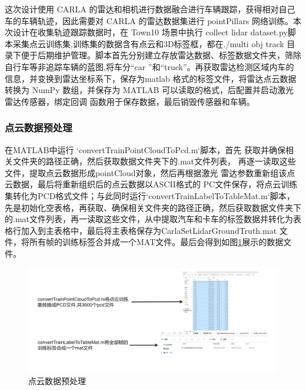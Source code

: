 这次设计使用 CARLA 的雷达和相机进行数据融合进行车辆跟踪，获得相对自己车的车辆轨迹，因此需要对 CARLA 的雷达数据集进行 pointPillars 网络训练。本次设计在收集轨迹跟踪数据时，在 Town10 场景中执行 collect lidar dataset.py脚本采集点云训练集,训练集的数据含有点云和3D标签框，都在./multi obj track 目录下便于后期维护管理。脚本首先分别建立存放雷达数据、标签数据文件夹，筛除自行车等非追踪车辆的蓝图,将车分“car ”和“truck”。再获取雷达检测区域内车的信息，并变换到雷达坐标系下，保存为matlab 格式的标签文件，将雷达点云数据转换为 NumPy 数组，并保存为 MATLAB 可以读取的格式，后配置并启动激光雷达传感器，绑定回调 函数用于保存数据，最后销毁传感器和车辆。

\subsubsection{点云数据预处理}
在MATLAB中运行 ‘convertTrainPointCloudToPcd.m‘脚本，首先 获取并确保相关文件夹的路径正确，然后获取数据文件夹下的.mat文件列表， 再逐一读取这些文件，提取点云数据形成pointCloud对象，然后再根据激光 雷达参数重新组该点云数据，最后将重新组织后的点云数据以ASCII格式的 PC文件保存，将点云训练集转化为PCD格式文件；与此同时运行‘convertTrainLabelToTableMat.m‘脚本，先是初始化空表格，再获取、确保相关文件夹的路径正确，然后获取数据文件夹下的.mat文件列表，再一读取这些文件，从中提取汽车和卡车的标签数据并转化为表格行加入到主表格中，最后将主表格保存为CarlaSetLidarGroundTruth.mat 文件，将所有帧的训练标签合并成一个MAT文件。最后会得到如图\ref{fig:p10}展示的数据文件。




\begin{figure}[htbp] %
	\centering
	\includegraphics[width=1\textwidth]{p10} %
	\caption{点云数据预处理} %
	\label{fig:p10} %
\end{figure}




